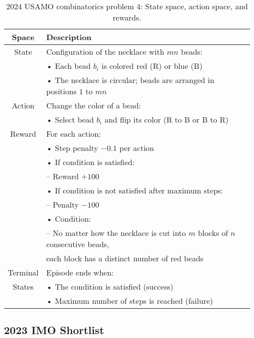 \begin{table}[htb]
\caption{2024 USAMO combinatorics problem 4: State space, action space, and rewards.}
  \centering
  \small
\begin{tabular}{cl}
  \toprule
  Space    & Description \\
  \midrule
  State    & Configuration of the necklace with \( m n \) beads: \\
           & • Each bead \( b_i \) is colored red (R) or blue (B) \\
           & • The necklace is circular; beads are arranged in positions \( 1 \) to \( m n \) \\
  Action   & Change the color of a bead: \\
           & • Select bead \( b_i \) and flip its color (R to B or B to R) \\
  Reward   & For each action: \\
           & • Step penalty \( -0.1 \) per action \\
           & • If condition is satisfied: \\
           &   – Reward \( +100 \) \\
           & • If condition is not satisfied after maximum steps: \\
           &   – Penalty \( -100 \) \\
           & • Condition: \\
           &   – No matter how the necklace is cut into \( m \) blocks of \( n \) consecutive beads, \\
           &     each block has a distinct number of red beads \\
  Terminal & Episode ends when: \\
  States   & • The condition is satisfied (success) \\
           & • Maximum number of steps is reached (failure) \\
  \bottomrule
\end{tabular}
\end{table}

\newpage
\clearpage








\subsection*{2023 IMO Shortlist}
\label{appendix:F_2023_IMO_Shortlist}

